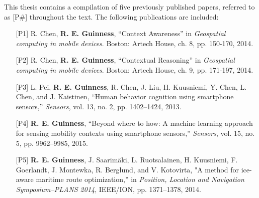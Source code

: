 This thesis contains a compilation of five previously published papers, referred to as [P\#] throughout the text. The following publications are included:

\begin{itemize}[leftmargin=2cm,labelsep=0.5cm]

\item [{[P1]}] R. Chen, \textbf{R. E. Guinness}, ``Context Awareness'' in \emph{Geospatial computing in mobile devices}. Boston: Artech House, ch. 8, pp. 150-170, 2014.
\item [{[P2]}] R. Chen, \textbf{R. E. Guinness}, ``Contextual Reasoning'' in \emph{Geospatial computing in mobile devices}. Boston: Artech House, ch. 9, pp. 171-197, 2014.
\item [{[P3]}] L. Pei, \textbf{R. E. Guinness}, R. Chen, J. Liu, H. Kuusniemi, Y. Chen, L. Chen, and J. Kaistinen, ``Human behavior cognition using smartphone sensors,'' \emph{Sensors}, vol. 13, no. 2, pp. 1402--1424, 2013.

\item [{[P4]}] \textbf{R. E. Guinness}, ``Beyond where to how: A machine learning approach for sensing mobility contexts using smartphone sensors,'' \emph{Sensors}, vol. 15, no. 5, pp. 9962--9985, 2015.

\item [{[P5]}] \textbf{R. E. Guinness}, J. Saarim\"{a}ki, L. Ruotsalainen, H. Kuusniemi, F. Goerlandt, J. Montewka, R. Berglund, and V. Kotovirta, "A method for ice-aware maritime route optimization,'' in \emph{Position, Location and Navigation Symposium--PLANS 2014}, IEEE/ION, pp. 1371--1378, 2014.

\end{itemize}
